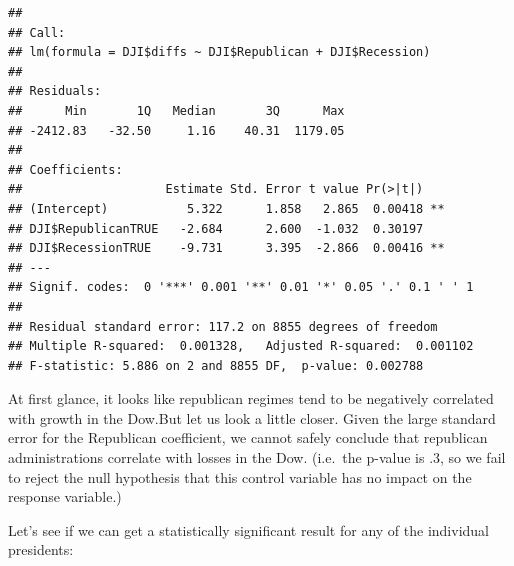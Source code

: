 \documentclass[]{article}
\newenvironment{Shaded}{\begin{snugshade}}{\end{snugshade}}
\newcommand{\KeywordTok}[1]{\textcolor[rgb]{0.13,0.29,0.53}{\textbf{#1}}}
\newcommand{\NormalTok}[1]{#1}
\newcommand{\OperatorTok}[1]{\textcolor[rgb]{0.81,0.36,0.00}{\textbf{#1}}}
\newcommand{\StringTok}[1]{\textcolor[rgb]{0.31,0.60,0.02}{#1}}
\begin{document}
\begin{Shaded}
\end{Shaded}

\begin{verbatim}
## 
## Call:
## lm(formula = DJI$diffs ~ DJI$Republican + DJI$Recession)
## 
## Residuals:
##      Min       1Q   Median       3Q      Max 
## -2412.83   -32.50     1.16    40.31  1179.05 
## 
## Coefficients:
##                    Estimate Std. Error t value Pr(>|t|)   
## (Intercept)           5.322      1.858   2.865  0.00418 **
## DJI$RepublicanTRUE   -2.684      2.600  -1.032  0.30197   
## DJI$RecessionTRUE    -9.731      3.395  -2.866  0.00416 **
## ---
## Signif. codes:  0 '***' 0.001 '**' 0.01 '*' 0.05 '.' 0.1 ' ' 1
## 
## Residual standard error: 117.2 on 8855 degrees of freedom
## Multiple R-squared:  0.001328,   Adjusted R-squared:  0.001102 
## F-statistic: 5.886 on 2 and 8855 DF,  p-value: 0.002788
\end{verbatim}

At first glance, it looks like republican regimes tend to be negatively
correlated with growth in the Dow.But let us look a little closer. Given
the large standard error for the Republican coefficient, we cannot
safely conclude that republican administrations correlate with losses in
the Dow. (i.e.~the p-value is .3, so we fail to reject the null
hypothesis that this control variable has no impact on the response
variable.)

Let's see if we can get a statistically significant result for any of
the individual presidents:
\end{document}
